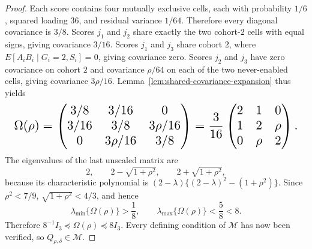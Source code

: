 \documentclass{article}
\begin{document}
\begin{proof}
Each score contains four mutually exclusive cells, each with probability \(1/6\), squared loading \(36\), and residual variance \(1/64\). Therefore every diagonal covariance is \(3/8\). Scores \(j_1\) and \(j_2\) share exactly the two cohort-\(2\) cells with equal signs, giving covariance \(3/16\). Scores \(j_1\) and \(j_3\) share cohort \(2\), where \(E[A_iB_i\mid G_i=2,S_i]=0\), giving covariance zero. Scores \(j_2\) and \(j_3\) have zero covariance on cohort \(2\) and covariance \(\rho/64\) on each of the two never-enabled cells, giving covariance \(3\rho/16\). Lemma~\ref{lem:shared-covariance-expansion} thus yields
\[
\makebox[\linewidth][c]{\resizebox{0.98\linewidth}{!}{\(\displaystyle \Omega(\rho)=
 \begin{pmatrix}
 3/8&3/16&0\\
 3/16&3/8&3\rho/16\\
 0&3\rho/16&3/8
 \end{pmatrix}
 =\frac3{16}
 \begin{pmatrix}
 2&1&0\\
 1&2&\rho\\
 0&\rho&2
 \end{pmatrix}.\)}}
\]
The eigenvalues of the last unscaled matrix are
\[
 2,
 \qquad 2-\sqrt{1+\rho^2},
 \qquad 2+\sqrt{1+\rho^2},
\]
because its characteristic polynomial is \((2-\lambda)\{(2-\lambda)^2-(1+\rho^2)\}\). Since \(\rho^2<7/9\), \(\sqrt{1+\rho^2}<4/3\), and hence
\[
 \lambda_{\min}\{\Omega(\rho)\}>\frac18,
 \qquad
 \lambda_{\max}\{\Omega(\rho)\}<\frac58<8.
\]
Therefore \(8^{-1}I_3\preceq\Omega(\rho)\preceq8I_3\). Every defining condition of \(\mathcal M\) has now been verified, so \(Q_{\rho,\delta}\in\mathcal M\).


\end{proof}
\end{document}
